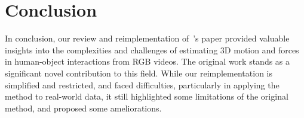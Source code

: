 \section{Conclusion}
\label{sec:conclusion}

In conclusion, our review and reimplementation of~\citet{li2019estimating}'s paper provided valuable insights into the complexities 
and challenges of estimating 3D motion and forces in human-object interactions from RGB videos. 
The original work stands as a significant novel contribution to this field. While our reimplementation is simplified and restricted, 
and faced difficulties, particularly in applying the method to real-world data, it still highlighted some limitations of the original method,
and proposed some ameliorations.

